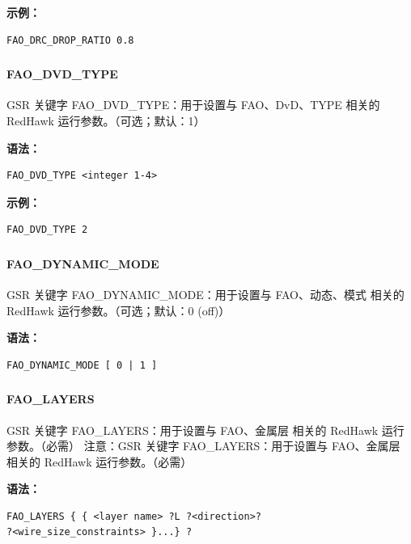 \textbf{示例：}
\begin{lstlisting}
FAO_DRC_DROP_RATIO 0.8
\end{lstlisting}

\subsubsection{}
\paragraph*{FAO_DVD_TYPE}

GSR 关键字 FAO_DVD_TYPE：用于设置与 FAO、DvD、TYPE 相关的 RedHawk 运行参数。（可选；默认：1）

\textbf{语法：}
\begin{lstlisting}
FAO_DVD_TYPE <integer 1-4>
\end{lstlisting}

\textbf{示例：}
\begin{lstlisting}
FAO_DVD_TYPE 2
\end{lstlisting}

\subsubsection{}
\paragraph*{FAO_DYNAMIC_MODE}

GSR 关键字 FAO_DYNAMIC_MODE：用于设置与 FAO、动态、模式 相关的 RedHawk 运行参数。（可选；默认：0 (off)）

\textbf{语法：}
\begin{lstlisting}
FAO_DYNAMIC_MODE [ 0 | 1 ]
\end{lstlisting}

\subsubsection{}
\paragraph*{FAO_LAYERS}

GSR 关键字 FAO_LAYERS：用于设置与 FAO、金属层 相关的 RedHawk 运行参数。（必需） 注意：GSR 关键字 FAO_LAYERS：用于设置与 FAO、金属层 相关的 RedHawk 运行参数。（必需）

\textbf{语法：}
\begin{lstlisting}
FAO_LAYERS { { <layer name> ?L ?<direction>?
?<wire_size_constraints> }...} ?
\end{lstlisting}

